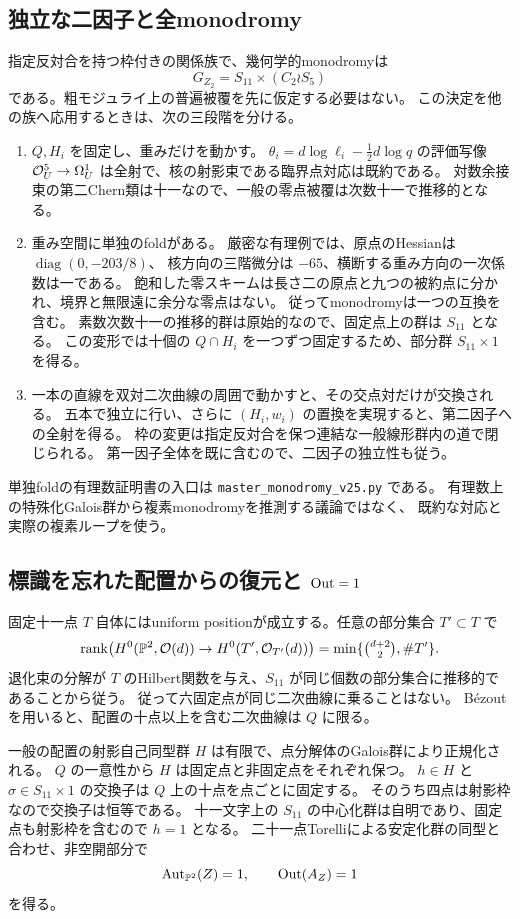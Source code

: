 \subsection{独立な二因子と全monodromy}
指定反対合を持つ枠付きの関係族で、幾何学的monodromyは
\[
 \boxed{G_{Z_2}=S_{11}\times(C_2\wr S_5)}
\]
である。粗モジュライ上の普遍被覆を先に仮定する必要はない。
この決定を他の族へ応用するときは、次の三段階を分ける。
\begin{enumerate}
\item $Q,H_i$ を固定し、重みだけを動かす。
$\theta_i=d\log\ell_i-\frac12d\log q$ の評価写像
$\mathcal O_U^5\to\Omega_U^1$ は全射で、核の射影束である臨界点対応は既約である。
対数余接束の第二Chern類は十一なので、一般の零点被覆は次数十一で推移的となる。
\item 重み空間に単独のfoldがある。
厳密な有理例では、原点のHessianは $\operatorname{diag}(0,-203/8)$、
核方向の三階微分は $-65$、横断する重み方向の一次係数は一である。
飽和した零スキームは長さ二の原点と九つの被約点に分かれ、境界と無限遠に余分な零点はない。
従ってmonodromyは一つの互換を含む。
素数次数十一の推移的群は原始的なので、固定点上の群は $S_{11}$ となる。
この変形では十個の $Q\cap H_i$ を一つずつ固定するため、部分群 $S_{11}\times1$ を得る。
\item 一本の直線を双対二次曲線の周囲で動かすと、その交点対だけが交換される。
五本で独立に行い、さらに $(H_i,w_i)$ の置換を実現すると、第二因子への全射を得る。
枠の変更は指定反対合を保つ連結な一般線形群内の道で閉じられる。
第一因子全体を既に含むので、二因子の独立性も従う。
\end{enumerate}
単独foldの有理数証明書の入口は \nolinkurl{master_monodromy_v25.py} である。
有理数上の特殊化Galois群から複素monodromyを推測する議論ではなく、
既約な対応と実際の複素ループを使う。

\subsection{標識を忘れた配置からの復元と $\operatorname{Out}=1$}
固定十一点 $T$ 自体にはuniform positionが成立する。任意の部分集合 $T'\subset T$ で
\[
 \operatorname{rank}\bigl(H^0(\mathbb P^2,\mathcal O(d))\to H^0(T',\mathcal O_{T'}(d))\bigr)
 =\min\{\tbinom{d+2}{2},\#T'\}.
\]
退化束の分解が $T$ のHilbert関数を与え、$S_{11}$ が同じ個数の部分集合に推移的であることから従う。
従って六固定点が同じ二次曲線に乗ることはない。
B\'ezoutを用いると、配置の十点以上を含む二次曲線は $Q$ に限る。

一般の配置の射影自己同型群 $H$ は有限で、点分解体のGalois群により正規化される。
$Q$ の一意性から $H$ は固定点と非固定点をそれぞれ保つ。
$h\in H$ と $\sigma\in S_{11}\times1$ の交換子は $Q$ 上の十点を点ごとに固定する。
そのうち四点は射影枠なので交換子は恒等である。
十一文字上の $S_{11}$ の中心化群は自明であり、固定点も射影枠を含むので $h=1$ となる。
二十一点Torelliによる安定化群の同型と合わせ、非空開部分で
\[
 \operatorname{Aut}_{\mathbb P^2}(Z)=1,\qquad \operatorname{Out}(A_Z)=1
\]
を得る\cite{PaperII}。

